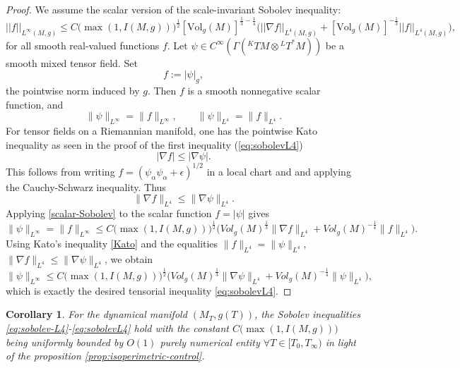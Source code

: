 \documentclass{amsart}
\newtheorem{corollary}{Corollary}[section]
\begin{document}
\begin{proof}
\noindent 
We assume the scalar version of the scale-invariant Sobolev inequality:
\begin{equation}\label{scalar-Sobolev}
 ||f||_{L^{\infty}(M,g)}\leq C\bigg(\max(1,I(M,g))\bigg)^{\frac{1}{2}}[\text{Vol}_{g}(M)]^{\frac{1}{3}-\frac{1}{4}}\bigg(||\nabla f||_{L^{4}(M,g)}+[\text{Vol}_{g}(M)]^{-\frac{1}{3}}||f||_{L^{4}(M,g)}\bigg),
\end{equation}
for all smooth real-valued functions $f$. Let $\psi\in C^{\infty}(\Gamma({}^{K}TM\otimes {}^{L}T^{*}M))$ be a smooth mixed tensor field.
Set 
\[
f := |\psi|_{g},
\]
the pointwise norm induced by $g$. Then $f$ is a smooth nonnegative scalar function, and
\[
\|\psi\|_{L^{\infty}}=\|f\|_{L^{\infty}},\qquad
\|\psi\|_{L^{4}}=\|f\|_{L^{4}}.
\]
\noindent 
For tensor fields on a Riemannian manifold, one has the pointwise Kato inequality as seen in the proof of the first inequality (\ref{eq:sobolevL4})
\begin{equation}\label{Kato}
 |\nabla f|\le |\nabla\psi|.
\end{equation}
This follows from writing $f = (\psi_{\alpha}\psi_{\alpha}+\epsilon)^{1/2}$ in a local chart and
and applying the Cauchy-Schwarz inequality.
Thus 
\[
\|\nabla f\|_{L^{4}} \le \|\nabla\psi\|_{L^{4}}.
\]
Applying \eqref{scalar-Sobolev} to the scalar function $f=|\psi|$ gives
\[
\|\psi\|_{L^{\infty}}
=\|f\|_{L^{\infty}}
\le C\Big(\max(1,I(M,g))\Big)^{\frac12}
 \Big( Vol_{g}(M)^{\frac13}\|\nabla f\|_{L^{4}}
     + {Vol}_{g}(M)^{-\frac14}\|f\|_{L^{4}} \Big).
\]
\noindent Using Kato's inequality \eqref{Kato} and the equalities
$\|f\|_{L^{4}}=\|\psi\|_{L^{4}}$, 
$\|\nabla f\|_{L^{4}}\le \|\nabla\psi\|_{L^{4}}$,
we obtain
\[
\|\psi\|_{L^{\infty}}
\le C\Big(\max(1,I(M,g))\Big)^{\frac12}
\Big( {Vol}_{g}(M)^{\frac13}\|\nabla\psi\|_{L^{4}}
    + {Vol}_{g}(M)^{-\frac14}\|\psi\|_{L^{4}} \Big),
\]
which is exactly the desired tensorial inequality \eqref{eq:sobolevL4}.
\end{proof}

\begin{corollary}
For the dynamical manifold $(M_{T},g(T))$, the Sobolev inequalities \ref{eq:sobolev-L4}-\ref{eq:sobolevL4} hold with the constant $C\bigg(\max(1,I(M,g))\bigg)$ being uniformly bounded by $O(1)$ purely numerical entity $\forall T\in [T_{0},T_{\infty})$ in light of the proposition \ref{prop:isoperimetric-control}.    
\end{corollary}
\end{document}
